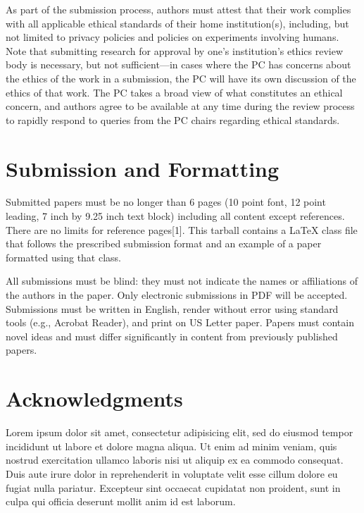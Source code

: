 \documentclass{hotnets22}
\begin{document}
As part of the submission process, authors must attest that their work complies with all applicable ethical standards of their home institution(s), including, but not limited to privacy policies and policies on experiments involving humans. Note that submitting research for approval by one's institution's ethics review body is necessary, but not sufficient---in cases where the PC has concerns about the ethics of the work in a submission, the PC will have its own discussion of the ethics of that work. The PC takes a broad view of what constitutes an ethical concern, and authors agree to be available at any time during the review process to rapidly respond to queries from the PC chairs regarding ethical standards.

\section{Submission and Formatting}

Submitted papers must be no longer than 6 pages (10 point font, 12 point leading, 7 inch by 9.25 inch text block) including all content except references. There are no limits for reference pages[1]. This tarball contains a LaTeX class file that follows the prescribed submission format and an example of a paper formatted using that class.

All submissions must be blind: they must not indicate the names or affiliations of the authors in the paper. Only electronic submissions in PDF will be accepted. Submissions must be written in English, render without error using standard tools (e.g., Acrobat Reader), and print on US Letter paper. Papers must contain novel ideas and must differ significantly in content from previously published papers.

\section*{Acknowledgments}

Lorem ipsum dolor sit amet, consectetur adipisicing elit, sed do eiusmod tempor incididunt ut labore et dolore magna aliqua. Ut enim ad minim veniam, quis nostrud exercitation ullamco laboris nisi ut aliquip ex ea commodo consequat. Duis aute irure dolor in reprehenderit in voluptate velit esse cillum dolore eu fugiat nulla pariatur. Excepteur sint occaecat cupidatat non proident, sunt in culpa qui officia deserunt mollit anim id est laborum.

 
\begin{small}

\end{small}
\end{document}
